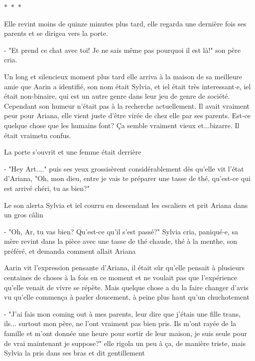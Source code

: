 \documentclass[12pt,hidelinks,a4paper]{book}
\newcommand{\sep}{\begin{center}
    $\ast$~$\ast$~$\ast$
  \end{center}}
\begin{document}
\sep 

Elle revint moins de quinze minutes plus tard, elle regarda une dernière fois ses parents et se dirigea vers la porte.\par 
- "Et prend ce chat avec toi! Je ne sais même pas pourquoi il est là!" son père cria.\par 
\bigskip 

Un long et silencieux moment plus tard elle arriva à la maison de sa meilleure amie que Aarin a identifié,
son nom était Sylvia, et iel était très interessant$\cdot$e, iel était non-binaire, qui est un autre genre dans leur 
jeu de genre de société. Cependant son humeur n'était pas à la recherche actuellement. Il avait vraiment peur 
pour Ariana, elle vient juste d'être virée de chez elle par ses parents. Est-ce quelque chose que les humains 
font? Ça semble vraiment vieux et...bizarre. Il était vraimetn confus.\par 
\bigskip

La porte s'ouvrit et une femme était derrière\par 
- "Hey Art...." puis ses yeux grossisèrent considérablement dès qu'elle vit l'état d'Ariana, 
"Oh, mon dieu, entre je vais te préparer une tasse de thé, qu'est-ce qui est arrivé chéri, tu as bien?"\par 
\bigskip

Le son alerta Sylvia et iel courru en descendant les escaliers et prit Ariana dans un gros câlin\par 
- "Oh, Ar, tu vas bien? Qu'est-ce qu'il s'est passé?" Sylvia cria, paniqué$\cdot$e, sa mère 
revint dans la pièce avec une tasse de thé chaude, thé à la menthe, son préféré, et demanda comment allait Ariana\par 
\bigskip

Aarin vit l'expression pensante d'Ariana, il était sûr qu'elle pensait à plusieurs centaines de choses à la fois 
en ce moment et ne voulait pas que l'expérience qu'elle venait de vivre se répète. Mais quelque chose a du la faire 
changer d'avis vu qu'elle commença à parler doucement, à peine plus haut qu'un chuchotement\par 
\bigskip 

- "J'ai fais mon coming out à mes parents, leur dire que j'étais une fille trans, ils... surtout mon père, 
ne l'ont vraiment pas bien pris. Ils m'ont rayée de la famille et m'ont donnée une heure pour sortir de leur 
maison, je suis seule pour de vrai maintenant je suppose?" elle rigola un peu à ça, de manière triste, mais 
Sylvia la pris dans ses bras et dit gentillement\par 
\bigskip
\end{document}

